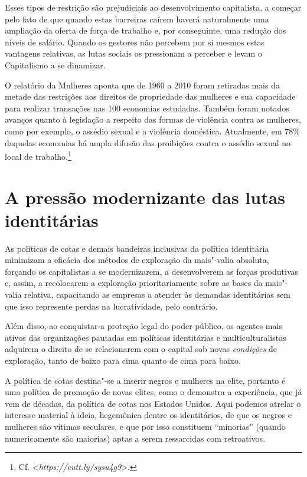 Esses tipos de restrição são prejudiciais ao desenvolvimento
capitalista, a começar pelo fato de que quando estas barreiras caírem
haverá naturalmente uma ampliação da oferta de força de trabalho e, por
conseguinte, uma redução dos níveis de salário. Quando os gestores não
percebem por si mesmos estas vantagens relativas, as lutas sociais os
pressionam a perceber e levam o Capitalismo a se dinamizar.

O relatório da  Mulheres aponta que de 1960 a 2010 foram retiradas
mais da metade das restrições aos direitos de propriedade das mulheres e
sua capacidade para realizar transações nas 100 economias estudadas.
Também foram notados avanços quanto à legislação a respeito das formas
de violência contra as mulheres, como por exemplo, o assédio sexual e a
violência doméstica. Atualmente, em 78\% daquelas economias há ampla
difusão das proibições contra o assédio sexual no local de
trabalho.\footnote{Cf. \textless{}\emph{https://cutt.ly/sysu4g9}\textgreater{}.}

\chapter{A pressão modernizante das lutas identitárias}

As políticas de cotas e demais bandeiras inclusivas da política
identitária minimizam a eficácia dos métodos de exploração da mais"-valia
absoluta, forçando os capitalistas a se modernizarem, a desenvolverem as
forças produtivas e, assim, a recolocarem a exploração prioritariamente
sobre as bases da mais"-valia relativa, capacitando as empresas a atender
às demandas identitárias sem que isso represente perdas na
lucratividade, pelo contrário.

Além disso, ao conquistar a proteção legal do poder público, os agentes
mais ativos das organizações pautadas em políticas identitárias e
multiculturalistas adquirem o direito de se relacionarem com o capital
sob novas \emph{condições} de exploração, tanto de baixo para cima
quanto de cima para baixo.

A política de cotas destina"-se a inserir negros e mulheres na elite,
portanto é uma política de promoção de novas elites, como o demonstra a
experiência, que já vem de décadas, da política de cotas nos Estados
Unidos. Aqui podemos atrelar o interesse material à ideia, hegemônica
dentre os identitários, de que os negros e mulheres são vítimas
seculares, e que por isso constituem ``minorias'' (quando numericamente
são maiorias) aptas a serem ressarcidas com retroativos.

